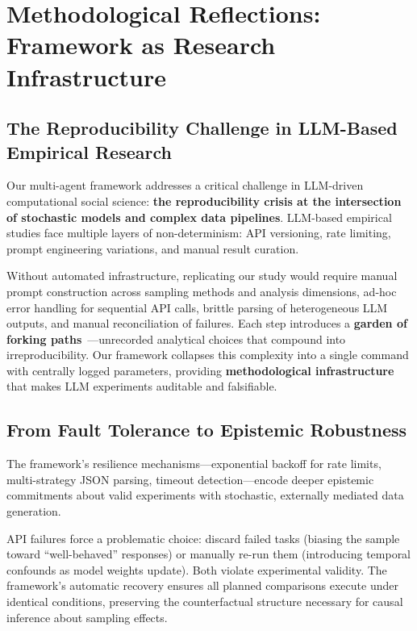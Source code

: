 \section{Methodological Reflections: Framework as Research Infrastructure}\label{sec:framework-role}

\subsection{The Reproducibility Challenge in LLM-Based Empirical Research}

Our multi-agent framework addresses a critical challenge in LLM-driven computational social science: \textbf{the reproducibility crisis at the intersection of stochastic models and complex data pipelines}. LLM-based empirical studies face multiple layers of non-determinism: API versioning, rate limiting, prompt engineering variations, and manual result curation. 

Without automated infrastructure, replicating our study would require manual prompt construction across sampling methods and analysis dimensions, ad-hoc error handling for sequential API calls, brittle parsing of heterogeneous LLM outputs, and manual reconciliation of failures. Each step introduces a \textbf{garden of forking paths}~\cite{gelman2013garden}---unrecorded analytical choices that compound into irreproducibility. Our framework collapses this complexity into a single command with centrally logged parameters, providing \textbf{methodological infrastructure} that makes LLM experiments auditable and falsifiable.

\subsection{From Fault Tolerance to Epistemic Robustness}

The framework's resilience mechanisms---exponential backoff for rate limits, multi-strategy JSON parsing, timeout detection---encode deeper epistemic commitments about valid experiments with stochastic, externally mediated data generation.

API failures force a problematic choice: discard failed tasks (biasing the sample toward ``well-behaved'' responses) or manually re-run them (introducing temporal confounds as model weights update). Both violate experimental validity. The framework's automatic recovery ensures all planned comparisons execute under identical conditions, preserving the counterfactual structure necessary for causal inference about sampling effects.

